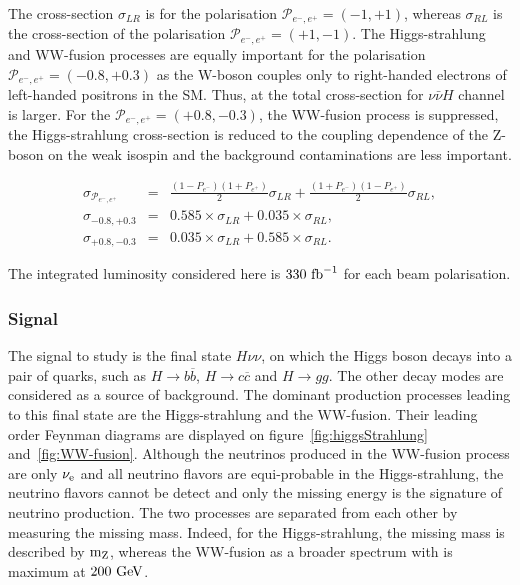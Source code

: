      The cross-section $\sigma_{LR}$ is for the polarisation $\mathcal{P}_{e^-,e^+} = (-1,+1)$, whereas $\sigma_{RL}$ is the cross-section of the polarisation $\mathcal{P}_{e^-,e^+} = (+1,-1)$.
     The Higgs-strahlung and WW-fusion processes are equally important for the polarisation $\mathcal{P}_{e^-,e^+} = (-0.8,+0.3)$ as the W-boson couples only to right-handed electrons of left-handed positrons in the \gls{SM}.
     Thus, at the total cross-section for $\nu\bar{\nu}H$ channel is larger.
     For the  $\mathcal{P}_{e^-,e^+} = (+0.8,-0.3)$, the WW-fusion process is suppressed, the Higgs-strahlung cross-section is reduced to the coupling dependence of the Z-boson on the weak isospin and the background contaminations are less important.

     \begin{equation}
       \begin{array}{lrc}
       \sigma_{\mathcal{P}_{e^-,e^+}} & = & \frac{(1 - P_{e^-})(1+P_{e^+})}{2} \sigma_{LR} + \frac{(1+P_{e^-})(1-P_{e^+})}{2} \sigma_{RL}, \\
       \sigma_{-0.8,+0.3} & = & 0.585 \times \sigma_{LR} + 0.035 \times \sigma_{RL}, \\
       \sigma_{+0.8,-0.3} & = & 0.035 \times \sigma_{LR} + 0.585 \times \sigma_{RL}.
       \end{array}
     \end{equation}

     The integrated luminosity considered here is $330~\rm{fb}^{-1}$ for each beam polarisation.

  \subsubsection{Signal}

    The signal to study is the final state $H \nu\nu$, on which the Higgs boson decays into a pair of quarks, such as $H \rightarrow b\overline{b}$, $H \rightarrow c\overline{c}$ and $H \rightarrow gg$. 
    The other decay modes are considered as a source of background. 
    The dominant production processes leading to this final state are the Higgs-strahlung and the WW-fusion.
    Their leading order Feynman diagrams are displayed on figure~\ref{fig:higgsStrahlung} and~\ref{fig:WW-fusion}.
    Although the neutrinos produced in the WW-fusion process are only $\nu_{\rm{e}}$ and all neutrino flavors are equi-probable in the Higgs-strahlung, the neutrino flavors cannot be detect and only the missing energy is the signature of neutrino production.
    The two processes are separated from each other by measuring the missing mass.
    Indeed, for the Higgs-strahlung, the missing mass is described by $\rm{m_Z}$, whereas the WW-fusion as a broader spectrum with is maximum at $200~\rm{GeV}$.

